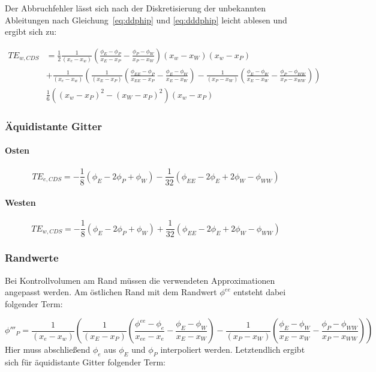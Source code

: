 Der Abbruchfehler lässt sich nach der Diskretisierung der unbekannten Ableitungen nach Gleichung~\eqref{eq:ddphip}
und \eqref{eq:dddphip} leicht ablesen und ergibt sich zu:

\begin{align}
  TE_{w, CDS} &=  \frac{1}{2} \frac{1}{(x_e-x_w)} \left({\frac{\phi_E-\phi_P}{x_E-x_P}
  - \frac{\phi_P-\phi_W}{x_P-x_W} }\right) \left({x_w-x_W}\right)(x_w-x_P)  \nonumber\\
  &+ \frac{1}{(x_e-x_w)} \left({
  \frac{1}{(x_E-x_P)} \left({\frac{\phi_{EE}-\phi_P}{x_{EE}-x_P}- \frac{\phi_E-\phi_W}{x_E-x_W} }\right)-
  \frac{1}{(x_P-x_W)} \left({\frac{\phi_E-\phi_W}{x_E-x_W} - \frac{\phi_P-\phi_{WW}}{x_P-x_{WW}} }\right)
  }\right) \nonumber\\
  &\frac{1}{6}  \left({(x_w-x_P)^2-(x_W-x_P)^2}\right)(x_w-x_P)
\end{align}

\subsubsection{Äquidistante Gitter}

\paragraph{Osten}

\begin{equation}
  TE_{e, CDS} = -\frac{1}{8} (\phi_E-2\phi_P+\phi_W) - \frac{1}{32}
  (\phi_{EE} - 2\phi_E + 2\phi_W - \phi_{WW})
\end{equation}

\paragraph{Westen}

\begin{equation}
  TE_{w, CDS} = -\frac{1}{8} (\phi_E-2\phi_P+\phi_W) + \frac{1}{32}
  (\phi_{EE} - 2\phi_E + 2\phi_W - \phi_{WW})
\end{equation}

\subsubsection{Randwerte}

Bei Kontrollvolumen am Rand müssen die verwendeten Approximationen angepasst werden.
Am östlichen Rand mit dem Randwert $\phi^{ee}$ entsteht dabei folgender Term:

\begin{equation*}
  \phi'''_P = \frac{1}{(x_e-x_w)} \left({
      \frac{1}{(x_E-x_P)} \left({\frac{\phi^{ee}-\phi_e}{x_{ee}-x_e}- \frac{\phi_E-\phi_W}{x_E-x_W} }\right)-
  \frac{1}{(x_P-x_W)} \left({\frac{\phi_E-\phi_W}{x_E-x_W} - \frac{\phi_P-\phi_{WW}}{x_P-x_{WW}} }\right)
  }\right)
\end{equation*}
Hier muss abschließend $\phi_e$ aus $\phi_E$ und $\phi_P$ interpoliert werden. Letztendlich ergibt
sich für äquidistante Gitter folgender Term:


